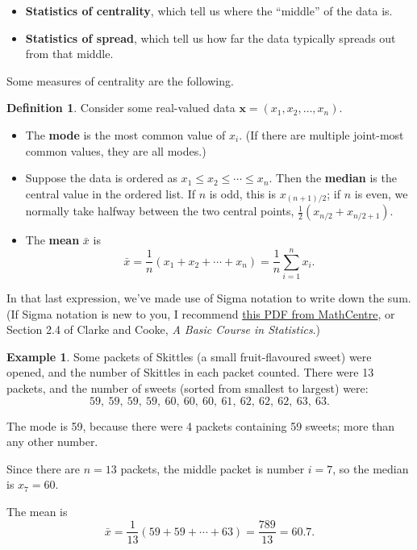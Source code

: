 \documentclass[
  a4paper,
]{book}
\providecommand{\tightlist}{%
  \setlength{\itemsep}{0pt}\setlength{\parskip}{0pt}}
\theoremstyle{definition}
\newtheorem{definition}{Definition}[chapter]
\theoremstyle{definition}
\newtheorem{example}{Example}[chapter]
\theoremstyle{definition}
\theoremstyle{definition}
\theoremstyle{remark}
\begin{document}
\begin{itemize}
\tightlist
\item
  \textbf{Statistics of centrality}, which tell us where the ``middle'' of the data is.
\item
  \textbf{Statistics of spread}, which tell us how far the data typically spreads out from that middle.
\end{itemize}

Some measures of centrality are the following.

\begin{definition}

Consider some real-valued data \(\mathbf x = (x_1, x_2, \dots, x_n)\).

\begin{itemize}
\tightlist
\item
  The \textbf{mode} is the most common value of \(x_i\). (If there are multiple joint-most common values, they are all modes.)
\item
  Suppose the data is ordered as \(x_1 \leq x_2 \leq \cdots \leq x_n\). Then the \textbf{median} is the central value in the ordered list. If \(n\) is odd, this is \(x_{(n+1)/2}\); if \(n\) is even, we normally take halfway between the two central points, \(\frac12(x_{n/2}+x_{n/2 + 1})\).
\item
  The \textbf{mean} \(\bar x\) is
  \[ \bar x = \frac{1}{n}(x_1 + x_2 + \cdots + x_n) = \frac1n \sum_{i=1}^n x_i . \]
\end{itemize}

\end{definition}

In that last expression, we've made use of Sigma notation to write down the sum. (If Sigma notation is new to you, I recommend \href{https://www.mathcentre.ac.uk/resources/workbooks/mathcentre/sigma.pdf}{this PDF from MathCentre}, or Section 2.4 of Clarke and Cooke, \emph{A Basic Course in Statistics}.)

\begin{example}
Some packets of Skittles (a small fruit-flavoured sweet) were opened, and the number of Skittles in each packet counted. There were 13 packets, and the number of sweets (sorted from smallest to largest) were:
\[ 59, \ 59, \ 59, \ 59, \ 60, \ 60, \ 60, \ 61, \ 62, \ 62, \ 62, \ 63, \ 63 .\]

The mode is 59, because there were 4 packets containing 59 sweets; more than any other number.

Since there are \(n = 13\) packets, the middle packet is number \(i = 7\), so the median is \(x_7 = 60\).

The mean is
\[ \bar x = \frac{1}{13} (59 + 59 + \cdots + 63) = \frac{789}{13} = 60.7 .\]
\end{example}
\end{document}
